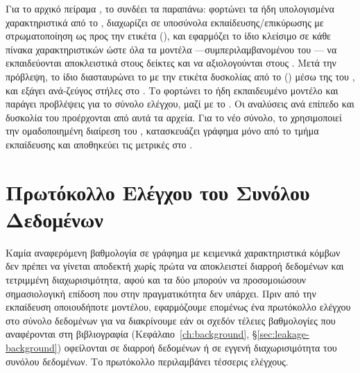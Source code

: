 Για το αρχικό πείραμα , το \texttt{} συνδέει τα παραπάνω: φορτώνει τα
ήδη υπολογισμένα χαρακτηριστικά από το \texttt{}, διαχωρίζει σε υποσύνολα
εκπαίδευσης/επικύρωσης με στρωματοποίηση ως προς την ετικέτα
(\texttt{}), και εφαρμόζει το ίδιο κλείσιμο \texttt{} σε
κάθε πίνακα χαρακτηριστικών ώστε όλα τα μοντέλα —συμπεριλαμβανομένου του
— να εκπαιδεύονται αποκλειστικά στους δείκτες \texttt{} και να αξιολογούνται
στους \texttt{}.
Μετά την πρόβλεψη, το ίδιο  διασταυρώνει το
\texttt{} με την ετικέτα δυσκολίας από το \texttt{}
(\texttt{}) μέσω της \texttt{} του
\texttt{}, και εξάγει ανά-ζεύγος στήλες
\texttt{} στο \texttt{}.
Το
\texttt{} φορτώνει το ήδη εκπαιδευμένο μοντέλο και
παράγει προβλέψεις για το σύνολο ελέγχου, μαζί με το \texttt{}.
Οι αναλύσεις ανά
επίπεδο και δυσκολία του  προέρχονται από αυτά τα αρχεία.
Για το νέο
σύνολο, το \texttt{}
χρησιμοποιεί την ομαδοποιημένη διαίρεση του \texttt{},
κατασκευάζει γράφημα μόνο από το τμήμα εκπαίδευσης και αποθηκεύει τις μετρικές στο
\texttt{}.


\section{Πρωτόκολλο Ελέγχου του Συνόλου Δεδομένων}
\label{sec:forensics-protocol}

Καμία αναφερόμενη βαθμολογία σε γράφημα με κειμενικά χαρακτηριστικά κόμβων δεν
πρέπει να γίνεται αποδεκτή χωρίς πρώτα να αποκλειστεί διαρροή δεδομένων και
τετριμμένη διαχωρισιμότητα, αφού και τα δύο μπορούν να προσομοιώσουν σημασιολογική
επίδοση που στην πραγματικότητα δεν υπάρχει.
Πριν από την εκπαίδευση οποιουδήποτε μοντέλου, εφαρμόζουμε επομένως ένα πρωτόκολλο
ελέγχου στο σύνολο δεδομένων  για να διακρίνουμε εάν οι σχεδόν
τέλειες βαθμολογίες που αναφέρονται στη βιβλιογραφία (Κεφάλαιο~\ref{ch:background},
\S\ref{sec:leakage-background}) οφείλονται σε διαρροή δεδομένων ή σε εγγενή
διαχωρισιμότητα του συνόλου δεδομένων.
Το πρωτόκολλο περιλαμβάνει τέσσερις ελέγχους.

